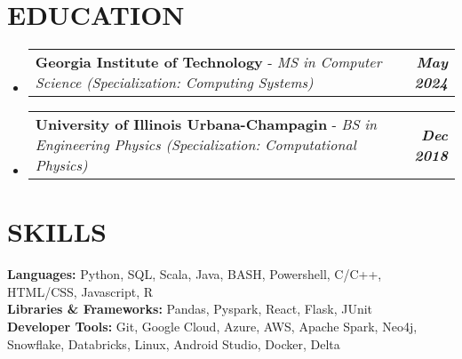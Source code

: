 \documentclass[letterpaper,11pt]{article}
\makeatletter
\newcommand{\educationSubheading}[3]{
  \vspace{-2pt}\item
    \begin{tabular*}{0.98\textwidth}[t]{l@{\extracolsep{\fill}}r}
      \textbf{\small#1} - \textit{\small#2} & \textbf{\textit{\small#3}} \\
    \end{tabular*}\vspace{-7pt}
}
\makeatother
\begin{document}
\section{\textbf{EDUCATION}} 
    \begin{itemize}[leftmargin=0.05in, label={}]
        \educationSubheading{Georgia Institute of Technology}{MS in Computer Science (Specialization: Computing Systems)}{May 2024}
        \educationSubheading{University of Illinois Urbana-Champagin}{BS in Engineering Physics (Specialization: Computational Physics)}{Dec 2018}
    \end{itemize}

%
\section{\textbf{SKILLS}}
    \begin{itemize}[leftmargin=0.05in, label={}]
        \small{\item{
        \textbf{Languages:}{ Python, SQL, Scala, Java, BASH, Powershell, C/C++, HTML/CSS, Javascript, R} \\
        \textbf{Libraries \& Frameworks:}{ Pandas, Pyspark, React, Flask, JUnit} \\
        \textbf{Developer Tools:}{ Git, Google Cloud, Azure, AWS, Apache Spark, Neo4j, Snowflake, Databricks, Linux, Android Studio, Docker, Delta} \\
        }}
    \end{itemize}


\end{document}
